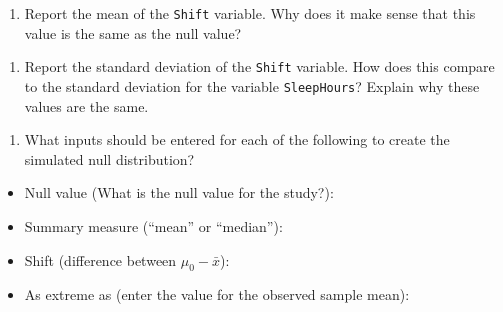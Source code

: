 \documentclass[
]{report}
\providecommand{\tightlist}{%
  \setlength{\itemsep}{0pt}\setlength{\parskip}{0pt}}
\begin{document}
\begin{enumerate}
\def\labelenumi{\arabic{enumi}.}
\setcounter{enumi}{6}
\tightlist
\item
  Report the mean of the \texttt{Shift} variable. Why does it make sense that this value is the same as the null value?
\end{enumerate}

\vspace{0.9in}

\begin{enumerate}
\def\labelenumi{\arabic{enumi}.}
\setcounter{enumi}{7}
\tightlist
\item
  Report the standard deviation of the \texttt{Shift} variable. How does this compare to the standard deviation for the variable \texttt{SleepHours}? Explain why these values are the same.
\end{enumerate}

\vspace{0.9in}

\begin{enumerate}
\def\labelenumi{\arabic{enumi}.}
\setcounter{enumi}{8}
\tightlist
\item
  What inputs should be entered for each of the following to create the simulated null distribution?
  \vspace{1mm}
\end{enumerate}

\begin{itemize}
\tightlist
\item
  Null value (What is the null value for the study?):
\end{itemize}

\vspace{.15in}

\begin{itemize}
\tightlist
\item
  Summary measure (``mean'' or ``median''):
\end{itemize}

\vspace{0.15in}

\begin{itemize}
\tightlist
\item
  Shift (difference between \(\mu_0 -\bar{x}\)):
\end{itemize}

\vspace{0.15in}

\begin{itemize}
\tightlist
\item
  As extreme as (enter the value for the observed sample mean):
\end{itemize}
\end{document}
